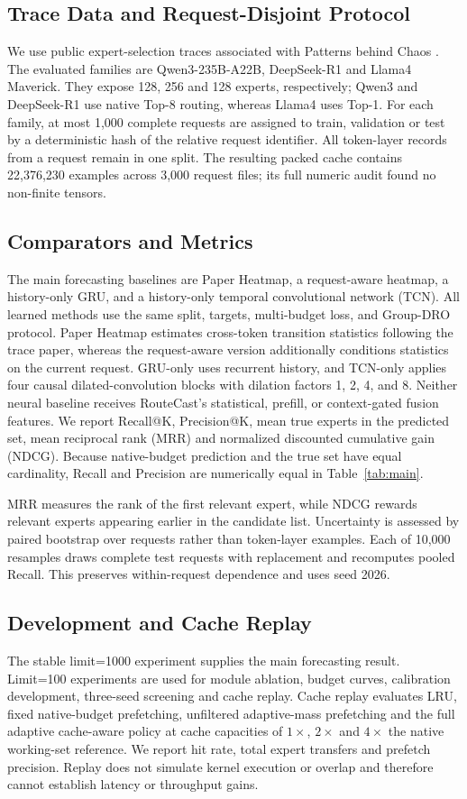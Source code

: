 \documentclass[conference]{IEEEtran}
\begin{document}
\subsection{Trace Data and Request-Disjoint Protocol}
We use public expert-selection traces associated with Patterns behind Chaos \cite{patterns}. The evaluated families are Qwen3-235B-A22B, DeepSeek-R1 and Llama4 Maverick. They expose 128, 256 and 128 experts, respectively; Qwen3 and DeepSeek-R1 use native Top-8 routing, whereas Llama4 uses Top-1. For each family, at most 1,000 complete requests are assigned to train, validation or test by a deterministic hash of the relative request identifier. All token-layer records from a request remain in one split. The resulting packed cache contains 22,376,230 examples across 3,000 request files; its full numeric audit found no non-finite tensors.

\subsection{Comparators and Metrics}
The main forecasting baselines are Paper Heatmap, a request-aware heatmap, a history-only GRU, and a history-only temporal convolutional network (TCN). All learned methods use the same split, targets, multi-budget loss, and Group-DRO protocol. Paper Heatmap estimates cross-token transition statistics following the trace paper, whereas the request-aware version additionally conditions statistics on the current request. GRU-only uses recurrent history, and TCN-only applies four causal dilated-convolution blocks with dilation factors 1, 2, 4, and 8. Neither neural baseline receives RouteCast's statistical, prefill, or context-gated fusion features. We report Recall@K, Precision@K, mean true experts in the predicted set, mean reciprocal rank (MRR) and normalized discounted cumulative gain (NDCG). Because native-budget prediction and the true set have equal cardinality, Recall and Precision are numerically equal in Table~\ref{tab:main}.

MRR measures the rank of the first relevant expert, while NDCG rewards relevant experts appearing earlier in the candidate list. Uncertainty is assessed by paired bootstrap over requests rather than token-layer examples. Each of 10,000 resamples draws complete test requests with replacement and recomputes pooled Recall. This preserves within-request dependence and uses seed 2026.

\subsection{Development and Cache Replay}
The stable limit=1000 experiment supplies the main forecasting result. Limit=100 experiments are used for module ablation, budget curves, calibration development, three-seed screening and cache replay. Cache replay evaluates LRU, fixed native-budget prefetching, unfiltered adaptive-mass prefetching and the full adaptive cache-aware policy at cache capacities of $1\times$, $2\times$ and $4\times$ the native working-set reference. We report hit rate, total expert transfers and prefetch precision. Replay does not simulate kernel execution or overlap and therefore cannot establish latency or throughput gains.
\end{document}
